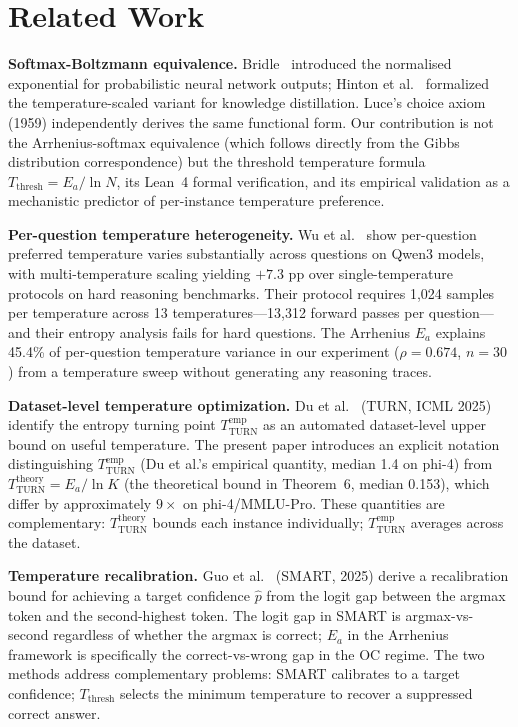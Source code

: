 \documentclass[11pt,letterpaper,twocolumn]{article}
\begin{document}
\section{Related Work}

\textbf{Softmax-Boltzmann equivalence.} Bridle~\cite{Bridle1989} introduced the
normalised exponential for probabilistic neural network outputs; Hinton et al.~\cite{Hinton2015}
formalized the temperature-scaled variant for knowledge distillation. Luce's choice axiom
(1959) independently derives the same functional form. Our contribution is not the
Arrhenius-softmax equivalence (which follows directly from the Gibbs distribution
correspondence) but the threshold temperature formula $T_\text{thresh} = E_a/\ln N$, its
Lean~4 formal verification, and its empirical validation as a mechanistic predictor of
per-instance temperature preference.

\textbf{Per-question temperature heterogeneity.} Wu et al.~\cite{Wu2025} show per-question
preferred temperature varies substantially across questions on Qwen3 models, with
multi-temperature scaling yielding $+7.3$ pp over single-temperature protocols on hard
reasoning benchmarks. Their protocol requires 1,024 samples per temperature across 13
temperatures---13,312 forward passes per question---and their entropy analysis fails for
hard questions. The Arrhenius $E_a$ explains 45.4\% of per-question temperature variance
in our experiment ($\rho = 0.674$, $n=30$) from a temperature sweep without generating
any reasoning traces.

\textbf{Dataset-level temperature optimization.} Du et al.~\cite{Du2025} (TURN, ICML 2025)
identify the entropy turning point $T_\text{TURN}^\text{emp}$ as an automated
dataset-level upper bound on useful temperature. The present paper introduces an explicit
notation distinguishing $T_\text{TURN}^\text{emp}$ (Du et al.'s empirical quantity,
median 1.4 on phi-4) from $T_\text{TURN}^\text{theory} = E_a/\ln K$ (the theoretical
bound in Theorem~6, median 0.153), which differ by approximately $9\times$ on
phi-4/MMLU-Pro. These quantities are complementary: $T_\text{TURN}^\text{theory}$ bounds
each instance individually; $T_\text{TURN}^\text{emp}$ averages across the dataset.

\textbf{Temperature recalibration.} Guo et al.~\cite{Guo2025} (SMART, 2025) derive a
recalibration bound for achieving a target confidence $\hat{p}$ from the logit gap between
the argmax token and the second-highest token. The logit gap in SMART is
argmax-vs-second regardless of whether the argmax is correct; $E_a$ in the Arrhenius
framework is specifically the correct-vs-wrong gap in the OC regime. The two methods
address complementary problems: SMART calibrates to a target confidence; $T_\text{thresh}$
selects the minimum temperature to recover a suppressed correct answer.
\end{document}

